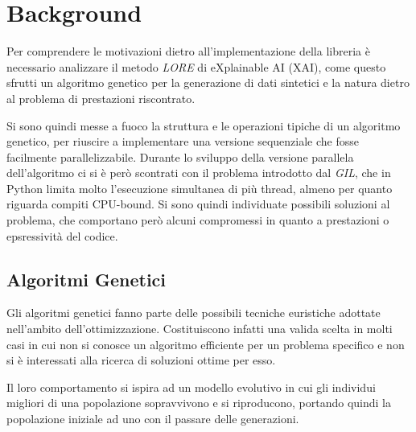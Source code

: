 \chapter{Background}\label{cap: background}

Per comprendere le motivazioni dietro all'implementazione della libreria è
necessario analizzare il metodo \textit{LORE} di eXplainable AI (XAI), come
questo sfrutti un algoritmo genetico per la generazione di dati sintetici e
la natura dietro al problema di prestazioni riscontrato.

Si sono quindi messe a fuoco la struttura e le operazioni tipiche di un
algoritmo genetico, per riuscire a implementare una versione sequenziale che
fosse facilmente parallelizzabile. Durante lo sviluppo della versione parallela
dell'algoritmo ci si è però scontrati con il problema introdotto dal
\textit{GIL}, che in Python limita molto l'esecuzione simultanea di più thread,
almeno per quanto riguarda compiti CPU-bound. Si sono quindi individuate
possibili soluzioni al problema, che comportano però alcuni compromessi in
quanto a prestazioni o epsressività del codice.

\section{Algoritmi Genetici}\label{sec: gen_alg}

Gli algoritmi genetici fanno parte delle possibili tecniche euristiche adottate
nell'ambito dell'ottimizzazione. Costituiscono infatti una valida scelta in
molti casi in cui non si conosce un algoritmo efficiente per un problema
specifico e non si è interessati alla ricerca di soluzioni ottime per esso.

Il loro comportamento si ispira ad un modello evolutivo in cui gli individui
migliori di una popolazione sopravvivono e si riproducono, portando quindi la
popolazione iniziale ad uno  con il passare delle
generazioni.

